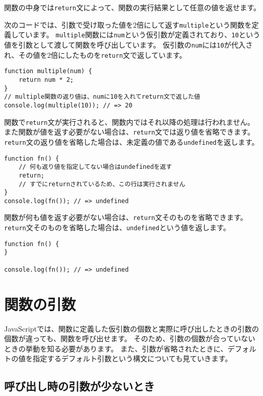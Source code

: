 関数の中身では\texttt{return}文によって、関数の実行結果として任意の値を返せます。

次のコードでは、引数で受け取った値を2倍にして返す\texttt{multiple}という関数を定義しています。
\texttt{multiple}関数には\texttt{num}という仮引数が定義されており、\texttt{10}という値を引数として渡して関数を呼び出しています。
仮引数の\texttt{num}には\texttt{10}が代入され、その値を2倍にしたものを\texttt{return}文で返しています。

\begin{lstlisting}
function multiple(num) {
    return num * 2;
}
// multiple関数の返り値は、numに10を入れてreturn文で返した値
console.log(multiple(10)); // => 20
\end{lstlisting}

関数で\texttt{return}文が実行されると、関数内ではそれ以降の処理は行われません。
また関数が値を返す必要がない場合は、\texttt{return}文では返り値を省略できます。
\texttt{return}文の返り値を省略した場合は、未定義の値である\texttt{undefined}を返します。

\begin{lstlisting}
function fn() {
    // 何も返り値を指定してない場合はundefinedを返す
    return;
    // すでにreturnされているため、この行は実行されません
}
console.log(fn()); // => undefined
\end{lstlisting}

関数が何も値を返す必要がない場合は、\texttt{return}文そのものを省略できます。
\texttt{return}文そのものを省略した場合は、\texttt{undefined}という値を返します。

\begin{lstlisting}
function fn() {
}

console.log(fn()); // => undefined
\end{lstlisting}

\hypertarget{function-arguments}{%
\section{関数の引数}\label{function-arguments}}

JavaScriptでは、関数に定義した仮引数の個数と実際に呼び出したときの引数の個数が違っても、関数を呼び出せます。
そのため、引数の個数が合っていないときの挙動を知る必要があります。
また、引数が省略されたときに、デフォルトの値を指定するデフォルト引数という構文についても見ていきます。

\hypertarget{function-less-arguments}{%
\subsection{呼び出し時の引数が少ないとき}\label{function-less-arguments}}

